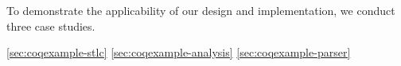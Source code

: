 To demonstrate the applicability of our design and implementation, we
conduct three case studies.



\bigskip 

\cref{sec:coqexample-stlc}
\cref{sec:coqexample-analysis}
\cref{sec:coqexample-parser}